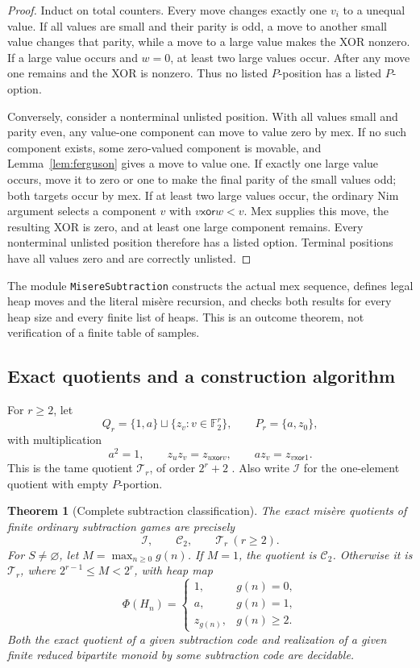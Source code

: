\documentclass[11pt]{article}
\newtheorem{theorem}{Theorem}[section]
\theoremstyle{definition}
\theoremstyle{remark}
\newcommand{\F}{\mathbb F}
\newcommand{\xor}{\mathbin{\mathsf{xor}}}
\begin{document}
\begin{proof}
Induct on total counters.  Every move changes exactly one $v_i$ to a
unequal value.  If all values are small and their parity is odd, a move to
another small value changes that parity, while a move to a large value
makes the XOR nonzero.  If a large value occurs and $w=0$, at least two
large values occur.  After any move one remains and the XOR is nonzero.
Thus no listed $P$-position has a listed $P$-option.

Conversely, consider a nonterminal unlisted position.  With all values
small and parity even, any value-one component can move to value zero by
mex.  If no such component exists, some zero-valued component is movable,
and Lemma~\ref{lem:ferguson} gives a move to value one.  If exactly one
large value occurs, move it to zero or one to make the final parity of the small
values odd; both targets occur by mex.  If at least two large values occur,
the ordinary Nim argument selects a component $v$ with
$v\xor w<v$.  Mex supplies this move, the resulting XOR is zero, and at
least one large component remains.  Every nonterminal unlisted position
therefore has a listed option.  Terminal positions have all values zero
and are correctly unlisted.
\end{proof}

The module \texttt{MisereSubtraction} constructs the actual mex sequence,
defines legal heap moves and the literal mis\`ere recursion, and checks
both results for every heap size and every finite list of heaps.  This is
an outcome theorem, not verification of a finite table of samples.

\subsection{Exact quotients and a construction algorithm}

For $r\ge2$, let
\[
 Q_r=\{1,a\}\sqcup\{z_v:v\in\F_2^r\},\qquad P_r=\{a,z_0\},
\]
with multiplication
\begin{equation}
 a^2=1,\qquad z_u z_v=z_{u\xor v},\qquad az_v=z_{v\xor1}.
\end{equation}
This is the tame quotient $\mathcal T_r$, of order $2^r+2$
\cite{plambecksiegel2008,siegel2006notes}.  Also write $\mathcal I$ for
the one-element quotient with empty $P$-portion.

\begin{theorem}[Complete subtraction classification]\label{thm:subtraction-classification}
The exact mis\`ere quotients of finite ordinary subtraction games are
precisely
\[
 \mathcal I,\qquad\mathcal C_2,\qquad\mathcal T_r\ (r\ge2).
\]
For $S\ne\varnothing$, let $M=\max_{n\ge0}g(n)$.  If $M=1$, the
quotient is $\mathcal C_2$.  Otherwise it is $\mathcal T_r$, where
$2^{r-1}\le M<2^r$, with heap map
\[
 \Phi(H_n)=
 \begin{cases}
 1,&g(n)=0,\\
 a,&g(n)=1,\\
 z_{g(n)},&g(n)\ge2.
 \end{cases}
\]
Both the exact quotient of a given subtraction code and realization of a
given finite reduced bipartite monoid by some subtraction code are decidable.
\end{theorem}
\end{document}
